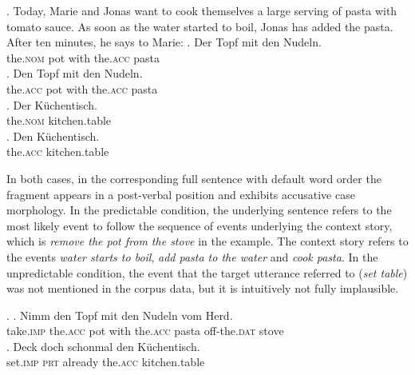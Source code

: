 \newpage
\ex. Today, Marie and Jonas want to cook themselves a large serving of pasta with tomato sauce. As soon as the water started to boil, Jonas has added the pasta. After ten minutes, he says to Marie:
\ag. Der Topf mit den Nudeln.\\
     the.\textsc{nom} pot with the.\textsc{acc} pasta\\ 
\bg. Den Topf mit den Nudeln.\\
     the.\textsc{acc} pot with the.\textsc{acc} pasta\\
       
\cg. Der Küchentisch.\\
     the.\textsc{nom} kitchen.table\\ 
\dg. Den Küchentisch.\\
     the.\textsc{acc} kitchen.table\\
      

In both cases, in the corresponding full sentence \Next with default word order the fragment appears in a post-verbal position and exhibits accusative case morphology. In the predictable condition, the underlying sentence \Next[a] refers to the most likely event to follow the sequence of events underlying the context story, which is \textit{remove the pot from the stove} in the example. The context story refers to the events \textit{water starts to boil}, \textit{add pasta to the water} and \textit{cook pasta}. In the unpredictable condition, the event that the target utterance \Next[b] referred to (\textit{set table}) was not mentioned in the corpus data, but it is intuitively not fully implausible.     
     
\ex. \ag. Nimm  den Topf mit den Nudeln vom Herd.\\
	  take.\textsc{imp} the.\textsc{acc} pot with the.\textsc{acc} pasta off-the.\textsc{dat} stove\\
     \bg. Deck doch schonmal den Küchentisch.\\
	  set.\textsc{imp} \textsc{prt} already the.\textsc{acc} kitchen.table\\

